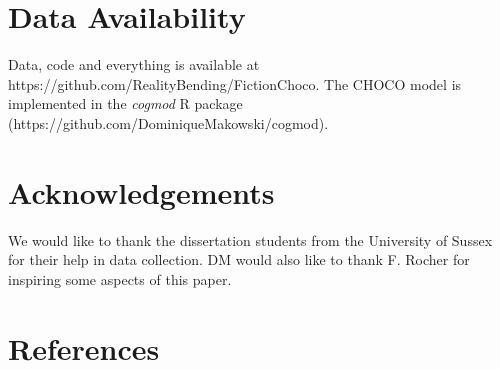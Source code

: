 \documentclass[
  jou,
  floatsintext,
  longtable,
  nolmodern,
  notxfonts,
  notimes,
  colorlinks=true,linkcolor=blue,citecolor=blue,urlcolor=blue]{apa7}
\begin{document}
\section{Data Availability}\label{data-availability}

Data, code and everything is available at
https://github.com/RealityBending/FictionChoco. The CHOCO model is
implemented in the \emph{cogmod} R package
(https://github.com/DominiqueMakowski/cogmod).

\section{Acknowledgements}\label{acknowledgements}

We would like to thank the dissertation students from the University of
Sussex for their help in data collection. DM would also like to thank F.
Rocher for inspiring some aspects of this paper.

\section{References}\label{references}
\end{document}
